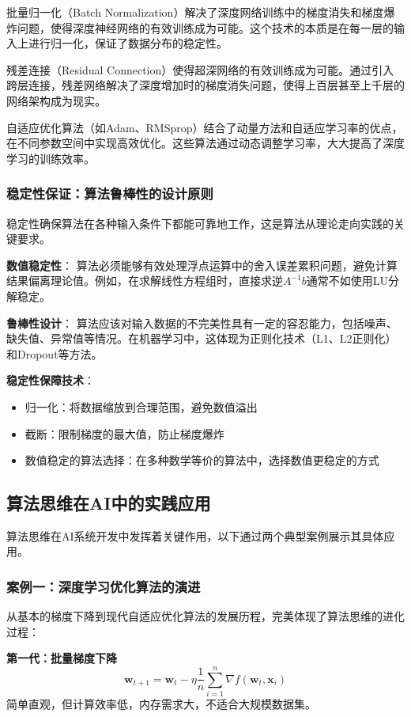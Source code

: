 批量归一化（Batch Normalization）解决了深度网络训练中的梯度消失和梯度爆炸问题，使得深度神经网络的有效训练成为可能。这个技术的本质是在每一层的输入上进行归一化，保证了数据分布的稳定性。

残差连接（Residual Connection）使得超深网络的有效训练成为可能。通过引入跨层连接，残差网络解决了深度增加时的梯度消失问题，使得上百层甚至上千层的网络架构成为现实。

自适应优化算法（如Adam、RMSprop）结合了动量方法和自适应学习率的优点，在不同参数空间中实现高效优化。这些算法通过动态调整学习率，大大提高了深度学习的训练效率。

\subsubsection{稳定性保证：算法鲁棒性的设计原则}

稳定性确保算法在各种输入条件下都能可靠地工作，这是算法从理论走向实践的关键要求。

\textbf{数值稳定性}：
算法必须能够有效处理浮点运算中的舍入误差累积问题，避免计算结果偏离理论值。例如，在求解线性方程组时，直接求逆$A^{-1}b$通常不如使用LU分解稳定。

\textbf{鲁棒性设计}：
算法应该对输入数据的不完美性具有一定的容忍能力，包括噪声、缺失值、异常值等情况。在机器学习中，这体现为正则化技术（L1、L2正则化）和Dropout等方法。

\textbf{稳定性保障技术}：
\begin{itemize}
\item 归一化：将数据缩放到合理范围，避免数值溢出
\item 截断：限制梯度的最大值，防止梯度爆炸
\item 数值稳定的算法选择：在多种数学等价的算法中，选择数值更稳定的方式
\end{itemize}

\subsection{算法思维在AI中的实践应用}

算法思维在AI系统开发中发挥着关键作用，以下通过两个典型案例展示其具体应用。

\subsubsection{案例一：深度学习优化算法的演进}

从基本的梯度下降到现代自适应优化算法的发展历程，完美体现了算法思维的进化过程：

\textbf{第一代：批量梯度下降}
$$\mathbf{w}_{t+1} = \mathbf{w}_t - \eta \frac{1}{n}\sum_{i=1}^{n}\nabla f(\mathbf{w}_t, \mathbf{x}_i)$$
简单直观，但计算效率低，内存需求大，不适合大规模数据集。

